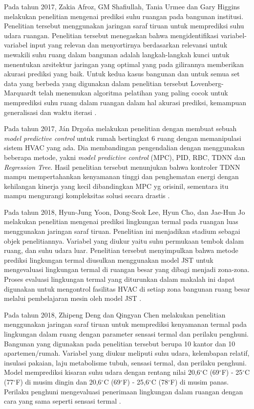 Pada tahun 2017, Zakia Afroz, GM Shafiullah, Tania Urmee dan Gary Higgins melakukan penelitian mengenai prediksi suhu ruangan pada bangunan institusi. Penelitian tersebut menggunakan jaringan saraf tiruan untuk memprediksi suhu udara ruangan. Penelitian tersebut menegaskan bahwa mengidentifikasi variabel-variabel input yang relevan dan menyortirnya berdasarkan relevansi untuk mewakili suhu ruang dalam bangunan adalah langkah-langkah kunci untuk menentukan arsitektur jaringan yang optimal yang pada gilirannya memberikan akurasi prediksi yang baik. Untuk kedua kasus bangunan dan untuk semua set data yang berbeda yang digunakan dalam penelitian tersebut Lovenberg-Marquardt telah menemukan algoritma pelatihan yang paling cocok untuk memprediksi suhu ruang dalam ruangan dalam hal akurasi prediksi, kemampuan generalisasi dan waktu iterasi \cite{article14}.

Pada tahun 2017, Ján Drgoňa melakukan penelitian dengan membuat sebuah \textit{model predictive control} untuk rumah bertingkat 6 ruang dengan memanipulasi sistem HVAC yang ada. Dia membandingan pengendalian dengan menggunakan beberapa metode, yakni \textit{model predictive control} (MPC), PID, RBC, TDNN dan \textit{Regression Tree}. Hasil penelitian tersebut menunjukan bahwa kontroler TDNN mampu mempertahankan kenyamanan tinggi dan penghematan energi dengan kehilangan kinerja yang kecil dibandingkan MPC yg orisinil, sementara itu mampu mengurangi kompleksitas solusi secara drastis \cite{article15}.

Pada tahun 2018, Hyun-Jung Yoon, Dong-Seok Lee, Hyun Cho, dan Jae-Hun Jo melakukan penelitian mengenai prediksi lingkungan termal pada ruangan luas menggunakan jaringan saraf tiruan. Penelitian ini menjadikan stadium sebagai objek penelitiannya. Variabel yang diukur yaitu suhu permukaan tembok dalam ruang, dan suhu udara luar. Penelitian tersebut menyimpulkan bahwa metode prediksi lingkungan termal diusulkan menggunakan model JST untuk mengevaluasi lingkungan termal di ruangan besar yang dibagi menjadi zona-zona. Proses evaluasi lingkungan termal yang diturunkan dalam makalah ini dapat digunakan untuk mengontrol fasilitas HVAC di setiap zona bangunan ruang besar melalui pembelajaran mesin oleh model JST \cite{article16}.

Pada tahun 2018, Zhipeng Deng dan Qingyan Chen melakukan penelitian menggunakan jaringan saraf tiruan untuk memprediksi kenyamanan termal pada lingkungan dalam ruang dengan parameter sensasi termal dan perilaku penghuni. Bangunan yang digunakan pada penelitian tersebut berupa 10 kantor dan 10 apartemen/rumah. Variabel yang diukur meliputi suhu udara, kelembapan relatif, insulasi pakaian, laju metabolisme tubuh, sensasi termal, dan perilaku penghuni. Model memprediksi kisaran suhu udara dengan rentang nilai 20,6$^{\circ}$C (69$^{\circ}$F) - 25$^{\circ}$C (77$^{\circ}$F) di musim dingin dan 20,6$^{\circ}$C (69$^{\circ}$F) - 25,6$^{\circ}$C (78$^{\circ}$F) di musim panas. Perilaku penghuni mengevaluasi penerimaan lingkungan dalam ruangan dengan cara yang sama seperti sensasi termal \cite{article17}.

